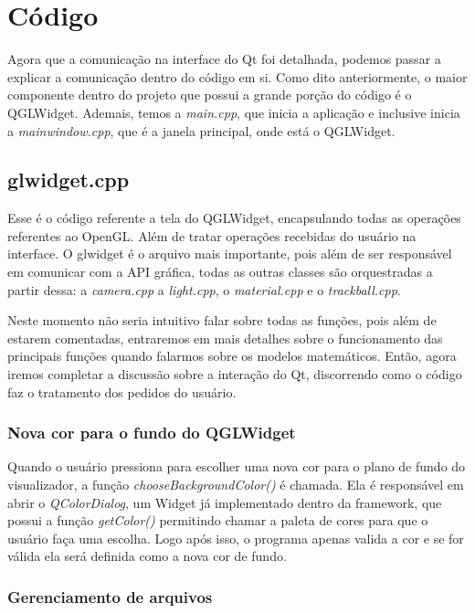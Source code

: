 \section{Código}

Agora que a comunicação na interface do Qt foi detalhada,
podemos passar a explicar a comunicação dentro do código em si. Como dito 
anteriormente, o maior componente dentro do projeto que possui a grande porção
do código é o QGLWidget. Ademais, temos a \emph{main.cpp}, que inicia a aplicação e 
inclusive inicia a \emph{mainwindow.cpp}, que é a janela principal, onde está o QGLWidget.

\subsection{glwidget.cpp}

Esse é o código referente a tela do QGLWidget, encapsulando todas as operações 
referentes ao OpenGL. Além de tratar operações recebidas do usuário na interface. 
O glwidget é o arquivo mais importante, pois além de ser responsável em comunicar 
com a API gráfica, todas as outras classes são orquestradas a partir dessa: 
a \emph{camera.cpp} a \emph{light.cpp}, o \emph{material.cpp} e o \emph{trackball.cpp}.

Neste momento não seria intuitivo falar sobre todas as funções, pois além de estarem comentadas, 
entraremos em mais detalhes sobre o funcionamento das principais funções quando falarmos 
sobre os modelos matemáticos. Então, agora iremos completar a discussão sobre a interação do 
Qt, discorrendo como o código faz o tratamento dos pedidos do usuário.

\subsubsection{Nova cor para o fundo do QGLWidget}

Quando o usuário pressiona para escolher uma nova cor para o plano de fundo do visualizador, 
a função \emph{chooseBackgroundColor()} é chamada. Ela é responsável em abrir o \emph{QColorDialog},
um Widget já implementado dentro da framework, que possui a função \emph{getColor()} permitindo chamar 
a paleta de cores para que o usuário faça uma escolha. Logo após isso, o programa apenas valida a cor 
e se for válida ela será definida como a nova cor de fundo.

\subsubsection{Gerenciamento de arquivos}

